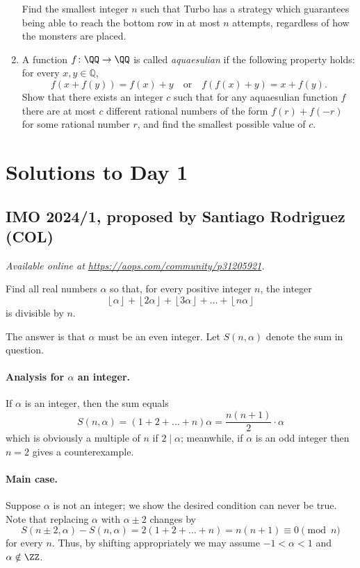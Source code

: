 \documentclass[11pt]{scrartcl}
\begin{document}
\begin{enumerate}[\bfseries 1.]
Find the smallest integer $n$ such that Turbo has a strategy which guarantees
being able to reach the bottom row in at most $n$ attempts,
regardless of how the monsters are placed.

\item %
A function $f \colon \QQ \to \QQ$ is called \emph{aquaesulian}
if the following property holds: for every $x,y \in \mathbb{Q}$,
\[ f(x+f(y)) = f(x) + y \quad \text{or} \quad f(f(x)+y) = x + f(y). \]
Show that there exists an integer $c$ such that for any aquaesulian function $f$
there are at most $c$ different rational numbers of the
form $f(r) + f(-r)$ for some rational number $r$,
and find the smallest possible value of $c$.

\end{enumerate}
\pagebreak

\section{Solutions to Day 1}
\subsection{IMO 2024/1, proposed by Santiago Rodriguez (COL)}
\textsl{Available online at \url{https://aops.com/community/p31205921}.}
\begin{mdframed}[style=mdpurplebox,frametitle={Problem statement}]
Find all real numbers $\alpha$ so that, for every positive integer $n$, the integer
\[ \left\lfloor \alpha \right\rfloor + \left\lfloor 2 \alpha \right\rfloor
  + \left\lfloor 3 \alpha \right\rfloor + \dots + \left\lfloor n \alpha \right\rfloor \]
is divisible by $n$.
\end{mdframed}
The answer is that $\alpha$ must be an even integer.
Let $S(n, \alpha)$ denote the sum in question.

\paragraph{Analysis for $\alpha$ an integer.}
If $\alpha$ is an integer, then the sum equals
\[ S(n, \alpha) = (1+2+\dots+n) \alpha = \frac{n(n+1)}{2} \cdot \alpha \]
which is obviously a multiple of $n$ if $2 \mid \alpha$;
meanwhile, if $\alpha$ is an odd integer then $n = 2$ gives a counterexample.

\paragraph{Main case.}
Suppose $\alpha$ is not an integer; we show the desired condition can never be true.
Note that replacing $\alpha$ with $\alpha \pm 2$ changes by
\[ S(n \pm 2, \alpha) - S(n, \alpha) = 2(1+2+\dots+n) = n(n+1) \equiv 0 \pmod n \]
for every $n$.
Thus, by shifting appropriately we may assume $-1 < \alpha < 1$ and $\alpha \notin \ZZ$.
\end{document}

